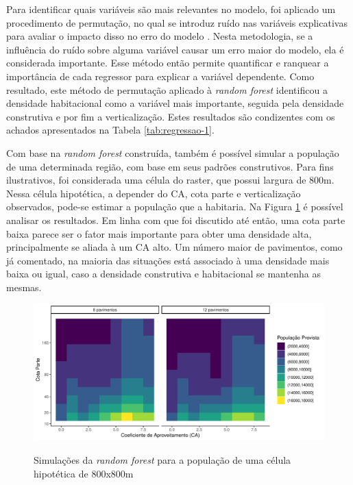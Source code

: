 Para identificar quais variáveis são mais relevantes no modelo, foi aplicado um procedimento de permutação, no qual se introduz ruído nas variáveis explicativas para avaliar o impacto disso no erro do modelo \cite{breiman2001random, Nembrini2018}. Nesta metodologia, se a influência do ruído sobre alguma variável causar um erro maior do modelo, ela é considerada importante. Esse método então permite quantificar e ranquear a importância de cada regressor para explicar a variável dependente. Como resultado, este método de permutação aplicado à \textit{random forest} identificou a densidade habitacional como a variável mais importante, seguida pela densidade construtiva e por fim a verticalização. Estes resultados são condizentes com os achados apresentados na Tabela \ref{tab:regressao-1}.

Com base na \textit{random forest} construída, também é possível simular a população de uma determinada região, com base em seus padrões construtivos. Para fins ilustrativos, foi considerada uma célula do raster, que possui largura de 800m. Nessa célula hipotética, a depender do CA, cota parte e verticalização observados, pode-se estimar a população que a habitaria. Na Figura \ref{fig:previsoes} é possível analisar os resultados. Em linha com que foi discutido até então, uma cota parte baixa parece ser o fator mais importante para obter uma densidade alta, principalmente se aliada à um CA alto. Um número maior de pavimentos, como já comentado, na maioria das situações está associado à uma densidade mais baixa ou igual, caso a densidade construtiva e habitacional se mantenha as mesmas.

\begin{figure}[h]
    \centering
    \caption{Simulações da \textit{random forest} para a população de uma célula hipotética de 800x800m}
    \includegraphics[width = \textwidth]{figuras/previsoes.pdf}
    \label{fig:previsoes}
\end{figure}

